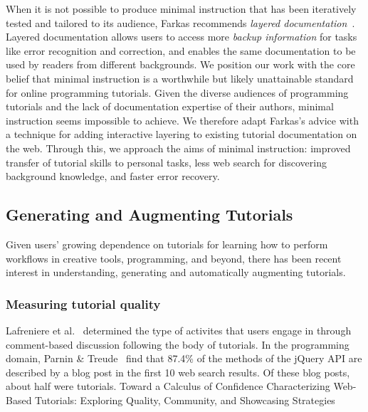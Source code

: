 When it is not possible to produce minimal instruction that has been iteratively tested and tailored to its audience, Farkas recommends \emph{layered documentation}~\cite{farkas_layering_1998}.
Layered documentation allows users to access more \emph{backup information} for tasks like error recognition and correction, and enables the same documentation to be used by readers from different backgrounds.
We position our work with the core belief that minimal instruction is a worthwhile but likely unattainable standard for online programming tutorials.
Given the diverse audiences of programming tutorials and the lack of documentation expertise of their authors, minimal instruction seems impossible to achieve.
We therefore adapt Farkas's advice with a technique for adding interactive layering to existing tutorial documentation on the web.
Through this, we approach the aims of minimal instruction: improved transfer of tutorial skills to personal tasks, less web search for discovering background knowledge, and faster error recovery.


\subsection{Generating and Augmenting Tutorials}

Given users' growing dependence on tutorials for learning how to perform workflows in creative tools, programming, and beyond, there has been recent interest in understanding, generating and automatically augmenting tutorials.

\subsubsection{Measuring tutorial quality}

Lafreniere et al.~\cite{lafreniere_understanding_2013} determined the type of activites that users engage in through comment-based discussion following the body of tutorials.
In the programming domain, Parnin \& Treude~\cite{parnin_measuring_2011} find that 87.4\% of the methods of the jQuery API are described by a blog post in the first 10 web search results.
Of these blog posts, about half were tutorials.
Toward a Calculus of Confidence
Characterizing Web-Based Tutorials: Exploring Quality, Community, and Showcasing Strategies

